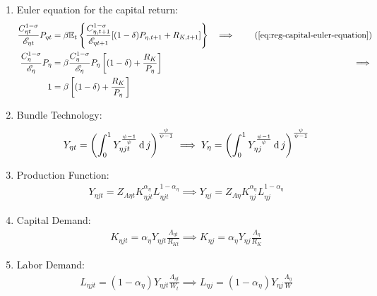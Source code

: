 \documentclass[../thesis.tex]{subfiles}
\begin{document}
\begin{enumerate}
	\item Euler equation for the capital return:
	\begin{alignat}{2}
		\frac{ C_{\eta t}^{1-\sigma}}{ \te} P_{\eta t} &= \beta \mathbb{E}_t \left\{ \frac{ C_{\eta, t+1}^{1-\sigma}}{ \te[t+1]} [(1-\delta) P_{\eta, t+1} + R_{K,t+1}] \right\} &\implies \tag{\ref{eq:reg-capital-euler-equation}} \\
		\frac{ C_{\eta}^{1-\sigma}}{ \te[]} P_{\eta} &= \beta \frac{ C_{\eta}^{1-\sigma}}{ \te[]} P_{\eta} \left[ (1-\delta) + \frac{R_{K}}{P_{\eta}} \right] &\implies \nonumber \\
		1 &= \beta \left[ (1-\delta) + \frac{R_{K}}{P_{\eta}} \right] \label{eq:reg-ss-capital-euler-equation}
	\end{alignat}

	\item Bundle Technology:
	\begin{align}
		Y_{\eta t} = \left( \int_{0}^{1} Y_{\eta jt}^{\frac{\psi-1}{\psi}} \dif j \right)^{\frac{\psi}{\psi-1}} \implies %
		Y_{\eta} = \left( \int_{0}^{1} Y_{\eta j}^{\frac{\psi-1}{\psi}} \dif j \right)^{\frac{\psi}{\psi-1}} \label{eq:reg-ss-final-goods-firm-bundle-rule}
	\end{align}
	
	\item Production Function:
	\begin{align}
		Y_{\eta jt} = Z_{A\eta t} K_{\eta jt}^{\alpha_{\eta}} L_{\eta jt}^{1-{\alpha_{\eta}}} \implies Y_{\eta j} = Z_{A\eta} K_{\eta j}^{\alpha_{\eta}} L_{\eta j}^{1-{\alpha_{\eta}}} \label{eq:reg-ss-int-good-firm-production-function}
	\end{align}
	
	\item Capital Demand:
	\begin{align}
		K_{\eta jt} = {\alpha_{\eta}} Y_{\eta jt} \frac{\Lambda_{\eta t}}{R_{Kt}} \implies K_{\eta j} = {\alpha_{\eta}} Y_{\eta j} \frac{\Lambda_{\eta}}{R_K} \label{eq:reg-ss-int-good-firm-FOC-Kt}
	\end{align}
	
	\item Labor Demand:
	\begin{align}
		L_{\eta jt} = (1-{\alpha_{\eta}}) Y_{\eta jt} \frac{\Lambda_{\eta t}}{W_t} \implies L_{\eta j} = (1 -{\alpha_{\eta}}) Y_{\eta j} \frac{\Lambda_{\eta}}{W} \label{eq:reg-ss-int-good-firm-FOC-Lt}
	\end{align}
	

\end{enumerate}
\end{document}
